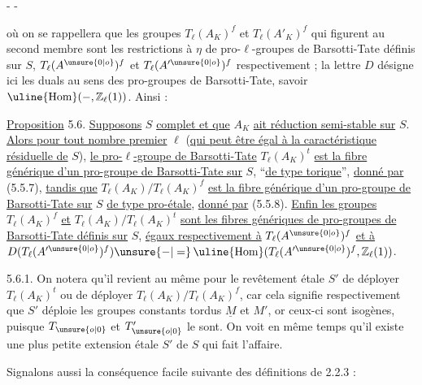 \begin{center}-  -\end{center}
\margin{$=$}
\margin{-}

où on se rappellera que les groupes $T_\ell(A_K)^f$ et $T_\ell(A'_K)^f$ qui figurent au second membre sont les restrictions à $\eta$ de pro-$\ell$-groupes de Barsotti-Tate définis sur $S$, $T_\ell(A^{\unsure{0|o}})^f$ et $T_\ell(A'^{\unsure{0|o}})^f$ respectivement ; la lettre $D$ désigne ici les duals au sens des pro-groupes de Barsotti-Tate, savoir $\operatorname{\uline{Hom}}(-,\mathbb Z_\ell(1))$. Ainsi :

\uline{Proposition} 5.6. \uline{Supposons} $S$ \uline{complet et que} $A_K$ \uline{ait réduction semi-stable sur} $S$. \uline{Alors pour tout nombre premier} $\ell$ (\uline{qui peut être égal à la caractéristique résiduelle de} $S$), \uline{le pro-}$\ell$\uline{-groupe de Barsotti-Tate} $T_\ell(A_K)^t$ \uline{est la fibre générique d'un pro-groupe de Barsotti-Tate sur} $S$, ``\uline{de type torique}'', \uline{donné par} (5.5.7), \uline{tandis que} $T_\ell(A_K)/T_\ell(A_K)^f$ \uline{est la fibre générique d'un pro-groupe de Barsotti-Tate sur} $S$ \uline{de type pro-étale}, \uline{donné par} (5.5.8). \uline{Enfin les groupes} $T_\ell(A_K)^f$ \uline{et} $T_\ell(A_K)/T_\ell(A_K)^t$ \uline{sont les fibres génériques de pro-groupes de Barsotti-Tate définis sur} $S$, \uline{égaux respectivement à} $T_\ell(A^{\unsure{0|o}})^f$ \uline{et à} $D(T_\ell(A'^{\unsure{0|o}})^f)\unsure{-|=}\operatorname{\uline{Hom}}(T_\ell(A'^{\unsure{0|o}})^f,\mathbb Z_\ell(1))$.

5.6.1. On notera qu'il revient au même pour le revêtement étale $S'$ de déployer $T_\ell(A_K)^t$ ou de déployer $T_\ell(A_K)/T_\ell(A_K)^f$, car cela signifie respectivement que $S'$ déploie les groupes constants tordus $\underline M$ et \uline{$M'$}, or ceux-ci sont isogènes, puisque $T_{\unsure{o|0}}$ et $T'_{\unsure{o|0}}$ le sont. On voit en même temps qu'il existe une plus petite extension étale $S'$ de $S$ qui fait l'affaire.

Signalons aussi la conséquence facile suivante des définitions de 2.2.3 :

\margin{-}
